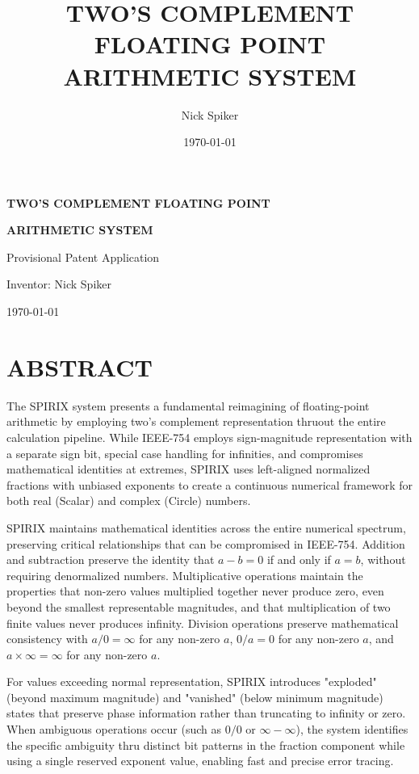 \documentclass[12pt,letter]{article}
\title{\textbf{TWO'S COMPLEMENT FLOATING POINT ARITHMETIC SYSTEM}}
\author{Nick Spiker}
\date{\today}
\begin{document}
\begin{titlepage}
\begin{center}
\vspace*{1cm}
{\huge \textbf{TWO'S COMPLEMENT FLOATING POINT}\par}
{\huge \textbf{ARITHMETIC SYSTEM}\par}
\vspace{2cm}
{\Large Provisional Patent Application\par}
\vspace{2.5cm}
{\Large Inventor: Nick Spiker\par}
\vspace{1cm}
{\Large \today\par}
\end{center}
\end{titlepage}
\newpage

\setcounter{page}{2}
\section{ABSTRACT} %

The SPIRIX system presents a fundamental reimagining of floating-point arithmetic by employing two's complement representation thruout the entire calculation pipeline. While IEEE-754 employs sign-magnitude representation with a separate sign bit, special case handling for infinities, and compromises mathematical identities at extremes, SPIRIX uses left-aligned normalized fractions with unbiased exponents to create a continuous numerical framework for both real (Scalar) and complex (Circle) numbers.

SPIRIX maintains mathematical identities across the entire numerical spectrum, preserving critical relationships that can be compromised in IEEE-754. Addition and subtraction preserve the identity that $a - b = 0$ if and only if $a = b$, without requiring denormalized numbers. Multiplicative operations maintain the properties that non-zero values multiplied together never produce zero, even beyond the smallest representable magnitudes, and that multiplication of two finite values never produces infinity. Division operations preserve mathematical consistency with $a/0 = \infty$ for any non-zero $a$, $0/a = 0$ for any non-zero $a$, and $a \times \infty = \infty$ for any non-zero $a$.

For values exceeding normal representation, SPIRIX introduces "exploded" (beyond maximum magnitude) and "vanished" (below minimum magnitude) states that preserve phase information rather than truncating to infinity or zero. When ambiguous operations occur (such as $0/0$ or $\infty - \infty$), the system identifies the specific ambiguity thru distinct bit patterns in the fraction component while using a single reserved exponent value, enabling fast and precise error tracing.
\end{document}
